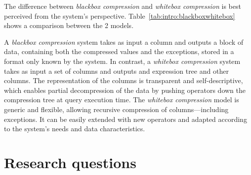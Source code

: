 The difference between \textit{blackbox compression} and \textit{whitebox compression} is best perceived from the system's perspective. Table~\ref{tab:intro:blackboxwhitebox} shows a comparison between the 2 models.



A \textit{blackbox compression} system takes as input a column and outputs a block of data, containing both the compressed values and the exceptions, stored in a format only known by the system. In contrast, a \textit{whitebox compression} system takes as input a set of columns and outputs and expression tree and other columns. The representation of the columns is transparent and self-descriptive, which enables  partial decompression of the data by pushing operators down the compression tree at query execution time. The \textit{whitebox compression} model is generic and flexible, allowing recursive compression of columns---including exceptions. It can be easily extended with new operators and adapted according to the system's needs and data characteristics.

\iffalse
- distinction between whitebox and blackbox compression/representation
- see presentation slides
\fi


\section{Research questions}

